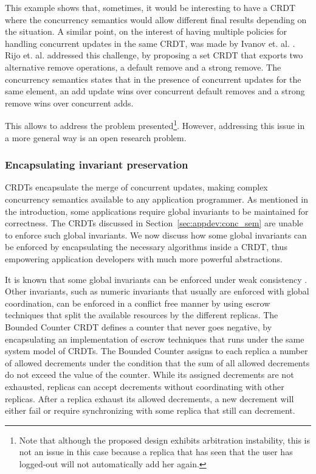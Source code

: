 \documentclass[12pt]{article}
\begin{document}
This example shows that, sometimes, it would be interesting to have 
a CRDT where the concurrency semantics would allow different final results
depending on the situation. 
A similar point, on the interest of having multiple policies for handling concurrent 
updates in the same CRDT, was made by Ivanov et. al. \cite{ivanov}.
Rijo et. al. \cite{addremovewins} addressed this challenge, by proposing 
a set CRDT that exports two alternative remove operations, a default 
remove and a strong remove.
The concurrency semantics states that in the presence of concurrent updates
for the same element, an add update wins over concurrent default removes and 
a strong remove wins over concurrent adds. 

This allows to address the problem presented\footnote{Note that although the 
proposed design exhibits arbitration instability, this is not an issue in this
case because a replica that has seen that the user has logged-out will 
not automatically add her again.}.
However, addressing this issue in a more general way is an open research problem.


\subsubsection{Encapsulating invariant preservation} 

CRDTs encapsulate the merge of concurrent updates, making complex concurrency
semantics available to any application programmer.
As mentioned in the introduction, some applications require global invariants
to be maintained for correctness.
The CRDTs discussed in Section~\ref{sec:appdev:conc_sem} are unable to enforce
such global invariants.
We now discuss how some global invariants can be enforced by encapsulating the
necessary algorithms inside a CRDT, 
thus empowering application developers with much more powerful abstractions.

It is known that some global invariants can be enforced under weak 
consistency \cite{Bailis14Coordination}.
Other invariants, such as numeric invariants that usually are enforced with 
global coordination, can be enforced in a conflict free manner by using 
escrow techniques \cite{ONeil86Escrow} that split the available resources
by the different replicas.  
The Bounded Counter CRDT \cite{DBLP:conf/srds/BalegasSDFSRP15} defines a counter that never goes 
negative, by encapsulating an implementation of escrow techniques that
runs under the same system model of CRDTs. 
The Bounded Counter assigns to each replica a number of allowed decrements under the condition that 
the sum of all allowed decrements do not exceed the value of the counter.
While its assigned decrements are not exhausted, replicas can accept decrements without coordinating
with other replicas.
After a replica exhaust its allowed decrements, a new decrement will either fail or require synchronizing 
with some replica that still can decrement.
\end{document}
